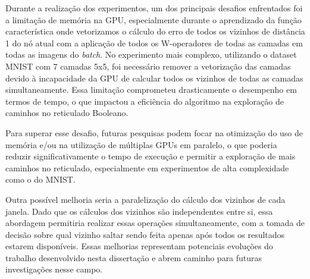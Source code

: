 Durante a realização dos experimentos, um dos principais desafios enfrentados foi a limitação de memória na GPU, especialmente durante o aprendizado da função característica onde vetorizamos o cálculo do erro de todos os vizinhos de distância 1 do nó atual com a aplicação de todos os W-operadores de todas as camadas em todas as imagens do \textit{batch}. No experimento mais complexo, utilizando o dataset MNIST com 7 camadas 5x5, foi necessário remover a vetorização das camadas devido à incapacidade da GPU de calcular todos os vizinhos de todas as camadas simultaneamente. Essa limitação comprometeu drasticamente o desempenho em termos de tempo, o que impactou a eficiência do algoritmo na exploração de caminhos no reticulado Booleano.

Para superar esse desafio, futuras pesquisas podem focar na otimização do uso de memória e/ou na utilização de múltiplas GPUs em paralelo, o que poderia reduzir significativamente o tempo de execução e permitir a exploração de mais caminhos no reticulado, especialmente em experimentos de alta complexidade como o do MNIST. 

Outra possível melhoria seria a paralelização do cálculo dos vizinhos de cada janela. Dado que os cálculos dos vizinhos são independentes entre si, essa abordagem permitiria realizar essas operações simultaneamente, com a tomada de decisão sobre qual vizinho saltar sendo feita apenas após todos os resultados estarem disponíveis. Essas melhorias representam potenciais evoluções do trabalho desenvolvido nesta dissertação e abrem caminho para futuras investigações nesse campo.